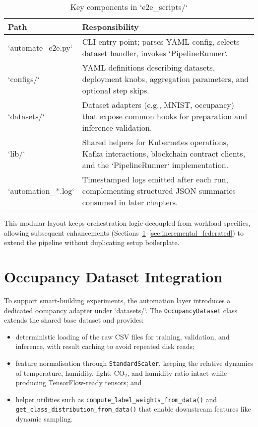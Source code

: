 \begin{table}[h!]
    \centering
    \caption{Key components in `e2e\_scripts/`}
    \label{tab:e2e_components}
    \begin{tabular}{p{} p{}}
        \toprule
        \textbf{Path} & \textbf{Responsibility} \\
        \midrule
        `automate\_e2e.py` & CLI entry point; parses YAML config, selects dataset handler, invokes `PipelineRunner`. \\
        `configs/` & YAML definitions describing datasets, deployment knobs, aggregation parameters, and optional step skips. \\
        `datasets/` & Dataset adapters (e.g., MNIST, occupancy) that expose common hooks for preparation and inference validation. \\
        `lib/` & Shared helpers for Kubernetes operations, Kafka interactions, blockchain contract clients, and the `PipelineRunner` implementation. \\
        `automation_*.log` & Timestamped logs emitted after each run, complementing structured JSON summaries consumed in later chapters. \\
    \bottomrule
    \end{tabular}
\end{table}

This modular layout keeps orchestration logic decoupled from workload specifics, allowing subsequent enhancements (Sections~\ref{sec:occupancy_integration}--\ref{sec:incremental_federated}) to extend the pipeline without duplicating setup boilerplate.

\section{Occupancy Dataset Integration}
\label{sec:occupancy_integration}

To support smart-building experiments, the automation layer introduces a dedicated occupancy adapter under `datasets/`. The \texttt{OccupancyDataset} class extends the shared base dataset and provides:

\begin{itemize}
    \item deterministic loading of the raw CSV files for training, validation, and inference, with result caching to avoid repeated disk reads;
    \item feature normalisation through \texttt{StandardScaler}, keeping the relative dynamics of temperature, humidity, light, CO$_2$, and humidity ratio intact while producing TensorFlow-ready tensors; and
    \item helper utilities such as \texttt{compute\_label\_weights\_from\_data()} and \texttt{get\_class\_distribution\_from\_data()} that enable downstream features like dynamic sampling.
\end{itemize}


